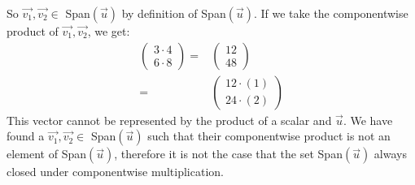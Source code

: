 \documentclass[12pt]{article}
\newenvironment{problem}[2][Problem]
{
	\begin{trivlist} 
		\item[\hskip \labelsep {\bfseries #1 #2:}]
	}
{
	\end{trivlist}
	}
\newenvironment{solution}[1][Solution]
{
	\begin{trivlist} 
		\item[\hskip \labelsep {\itshape #1:}]
	}
	{
	\end{trivlist}
}
\begin{document}
\begin{problem}{2}
\begin{solution}
\[\]
So $\vec{v_{1}}, \vec{v_{2}} \in$ Span$(\vec{u})$ by definition of Span$(\vec{u})$. If we take the componentwise product of $\vec{v_{1}}, \vec{v_{2}}$, we get:
\begin{align*}
\begin{pmatrix} 3\cdot4\\6\cdot8 \end{pmatrix} =& \begin{pmatrix} 12\\48 \end{pmatrix}\\
=& \begin{pmatrix} 12 \cdot (1)\\24 \cdot(2) \end{pmatrix}
\end{align*}
This vector cannot be represented by the product of a scalar and $\vec{u}$. We have found a $\vec{v_{1}},\vec{v_{2}} \in$ Span$(\vec{u})$ such that their componentwise product is not an element of Span$(\vec{u})$, therefore it is not the case that the set Span$(\vec{u})$ always closed under componentwise multiplication.
\end{solution}
\end{problem}
\end{document}
